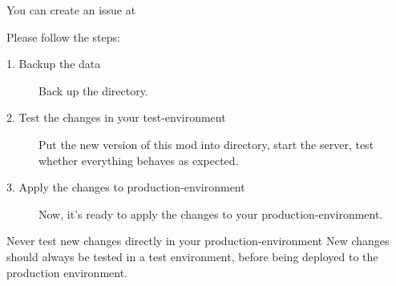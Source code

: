 You can create an issue at \issueurl



Please follow the steps:
\begin{description}
    \item[1. Backup the data] {Back up the  directory.}
    \item[2. Test the changes in your test-environment] {Put the new version of this mod into  directory, start the server, test whether everything behaves as expected.}
    \item[3. Apply the changes to production-environment] {Now, it's ready to apply the changes to your production-environment.}
\end{description}

\begin{warn}{Never test new changes directly in your production-environment}
    New changes should always be tested in a test environment, before being deployed to the production environment.
\end{warn}



